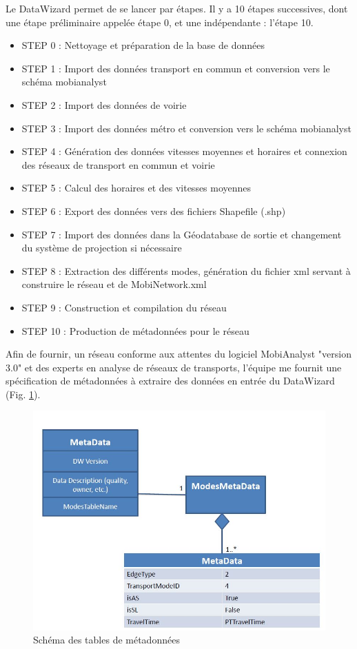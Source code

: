 \begin{itemize}
Le DataWizard permet de se lancer par étapes. Il y a 10 étapes successives, dont une étape préliminaire appelée étape 0, et une indépendante : l'étape 10.
\begin{itemize}
\item STEP 0 : Nettoyage et préparation de la base de données
\item STEP 1 : Import des données transport en commun et conversion vers le schéma mobianalyst
\item STEP 2 : Import des données de voirie
\item STEP 3 : Import des données métro et conversion vers le schéma mobianalyst
\item STEP 4 : Génération des données vitesses moyennes et horaires et connexion des réseaux de transport en commun et voirie
\item STEP 5 : Calcul des horaires et des vitesses moyennes
\item STEP 6 : Export des données vers des fichiers Shapefile (.shp)
\item STEP 7 : Import des données dans la Géodatabase de sortie et changement du système de projection si nécessaire
\item STEP 8 : Extraction des différents modes, génération du fichier xml servant à construire le réseau et de MobiNetwork.xml
\item STEP 9 : Construction et compilation du réseau
\item STEP 10 : Production de métadonnées pour le réseau
\end{itemize}

Afin de fournir, un réseau conforme aux attentes du logiciel MobiAnalyst "version 3.0" et des experts en analyse de réseaux de transports, l'équipe me fournit une spécification de métadonnées à extraire des données en entrée du DataWizard (Fig. \ref{DW_Metadata}).\\

\begin{figure}[!h]
\centering
\includegraphics[width=14cm]{images/DW_specMetadata.JPG}
\caption{\label{DW_Metadata}Schéma des tables de métadonnées}
\end{figure} 


\end{itemize}
